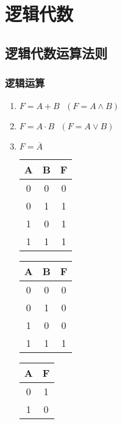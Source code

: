\chapter{逻辑代数}
\newpage

\section{逻辑代数运算法则}

\subsection{逻辑运算}

\begin{enumerate}

\item $F=A+B~~~(F=A\wedge B)$
\item $F=A\cdot B~~~(F=A\vee B)$
\item $F=\overline A$

\begin{table*}[!htbp]

\begin{minipage}{\columnwidth}
    \caption{$F=A+B~~~(F=A\wedge B)$}
    \centering
    \begin{tabular}{|c|c|c|}
        \hline
        A & B & F \\
        \hline
        0 & 0 & 0 \\
        \hline
        0 & 1 & 1 \\
        \hline
        1 & 0 & 1 \\
        \hline
        1 & 1 & 1 \\
        \hline
    \end{tabular}
\end{minipage}

\begin{minipage}{\columnwidth}
    \caption{$F=A\cdot B~~~(F=A\vee B)$}
    \centering
    \begin{tabular}{|c|c|c|}
        \hline
        A & B & F \\
        \hline
        0 & 0 & 0 \\
        \hline
        0 & 1 & 0 \\
        \hline
        1 & 0 & 0 \\
        \hline
        1 & 1 & 1 \\
        \hline
    \end{tabular}
\end{minipage}

\begin{minipage}{\columnwidth}
    \caption{$F=\overline A$}
    \centering
    \begin{tabular}{|c|c|}
        \hline
        A & F \\
        \hline
        0 & 1 \\
        \hline
        1 & 0 \\
        \hline
    \end{tabular}
\end{minipage}

\end{table*}

\end{enumerate}

